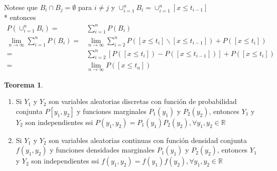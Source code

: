 \documentclass[12pt,letterpaper]{article}
\theoremstyle{definition}
\newtheorem{theorem}{Teorema}[section]
\begin{document}
Notese que $B_i\cap B_j=\emptyset$ para $i\neq j$ y $\cup^n_{i=1}B_i=\cup^n_{i=1}[x\leq t_{i-1}]$\\*
entonces 
\[
\begin{array}{rl}
	P\left(\cup^{n}_{i=1}B_i\right)=&\sum^{n}_{i=1}P(B_i)\\
	\lim\limits_{n\to \infty} \sum^{n}_{i=1}P(B_i)=& \lim\limits_{n\to \infty}\sum^{n}_{i=2}P([x\leq t_i]\smallsetminus [x\leq t_{i-1}])+P([x\leq t_i])\\
	=& \sum^{n}_{i=2}\left[P([x\leq t_i])-P([x\leq t_{i-1}])\right]+P([x\leq t_i])\\
	=& \lim\limits_{n\to \infty} P([x\leq t_n])
\end{array}
\]

\begin{theorem}
\hfill
	\begin{enumerate}
		\item Si $Y_1$ y $Y_2$ son variables aleatorias discretas con función de probabilidad conjunta $P[y_1,y_2]$ y funciones marginales $P_1(y_1)$ y $P_2(y_2)$, entonces $Y_1$ y $Y_2$ son independientes ssi $P(y_1,y_2)=P_1(y_1)P_2(y_2),\forall y_1,y_2\in \mathbb{R}$
		\item Si $Y_1$ y $Y_2$ son variables aleatorias continuas con función densidad conjunta $f(y_1,y_2)$ y funciones densidades marginales $P_1(y_1)$ y $P_2(y_2)$, entonces $Y_1$ y $Y_2$ son independientes ssi $f(y_1,y_2)=f(y_1)f(y_2),\forall y_1,y_2\in \mathbb{R}$
	\end{enumerate}
\end{theorem}
\end{document}
